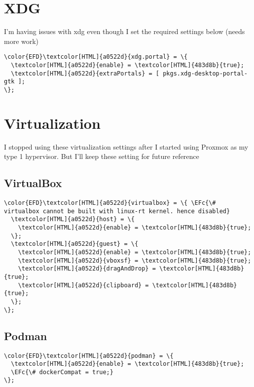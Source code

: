 \documentclass[14pt]{article}
\newcommand{\EFc}[1]{\textcolor{EFc}{#1}} %
\begin{document}
\section{XDG}
\label{sec:orga69a0a4}
I'm having issues with xdg even though I set the required settings below (needs more work)
\begin{Code}
\begin{Verbatim}
\color{EFD}\textcolor[HTML]{a0522d}{xdg.portal} = \{
  \textcolor[HTML]{a0522d}{enable} = \textcolor[HTML]{483d8b}{true};
  \textcolor[HTML]{a0522d}{extraPortals} = [ pkgs.xdg-desktop-portal-gtk ];
\};
\end{Verbatim}
\end{Code}
\section{Virtualization}
\label{sec:org8fa252f}
I stopped using these virtualization settings after I started using Proxmox as my type 1 hypervisor. But I'll keep these setting for future reference
\subsection{VirtualBox}
\label{sec:org372af33}
\begin{Code}
\begin{Verbatim}
\color{EFD}\textcolor[HTML]{a0522d}{virtualbox} = \{ \EFc{\# virtualbox cannot be built with linux-rt kernel. hence disabled}
  \textcolor[HTML]{a0522d}{host} = \{
    \textcolor[HTML]{a0522d}{enable} = \textcolor[HTML]{483d8b}{true};
  \};
  \textcolor[HTML]{a0522d}{guest} = \{
    \textcolor[HTML]{a0522d}{enable} = \textcolor[HTML]{483d8b}{true};
    \textcolor[HTML]{a0522d}{vboxsf} = \textcolor[HTML]{483d8b}{true};
    \textcolor[HTML]{a0522d}{dragAndDrop} = \textcolor[HTML]{483d8b}{true};
    \textcolor[HTML]{a0522d}{clipboard} = \textcolor[HTML]{483d8b}{true};
  \};
\};
\end{Verbatim}
\end{Code}
\subsection{Podman}
\label{sec:org2ce5a3b}
\begin{Code}
\begin{Verbatim}
\color{EFD}\textcolor[HTML]{a0522d}{podman} = \{
  \textcolor[HTML]{a0522d}{enable} = \textcolor[HTML]{483d8b}{true};
  \EFc{\# dockerCompat = true;}
\};
\end{Verbatim}
\end{Code}
\end{document}
